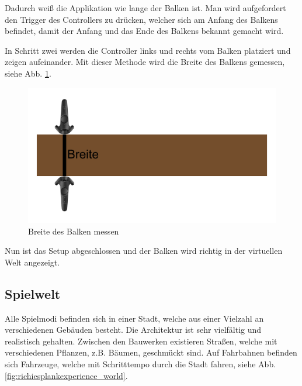 Dadurch weiß die Applikation wie lange der Balken ist.
Man wird aufgefordert den Trigger des Controllers zu drücken, welcher sich am Anfang des Balkens befindet, damit der Anfang und das Ende des Balkens bekannt gemacht wird.



In Schritt zwei werden die Controller links und rechts vom Balken platziert und zeigen aufeinander.
Mit dieser Methode wird die Breite des Balkens gemessen, siehe Abb. \ref{fig:beam_width_measurement}.

\begin {figure}
    \includegraphics[scale=0.18]{pics/beam_width_measurement}
    \caption{Breite des Balken messen}
    \label{fig:beam_width_measurement}
\end {figure}


Nun ist das Setup abgeschlossen und der Balken wird richtig in der virtuellen Welt angezeigt.
~\cite{ToastGames_2021_Setup}

\subsection{Spielwelt}
\label{sec:richiesplankexperience_world}
Alle Spielmodi befinden sich in einer Stadt, welche aus einer Vielzahl an verschiedenen Gebäuden besteht.
Die Architektur ist sehr vielfältig und realistisch gehalten.
Zwischen den Bauwerken existieren Straßen, welche mit verschiedenen Pflanzen, z.B. Bäumen, geschmückt sind.
Auf Fahrbahnen befinden sich Fahrzeuge, welche mit Schritttempo durch die Stadt fahren, siehe Abb. \ref{fig:richiesplankexperience_world}.

